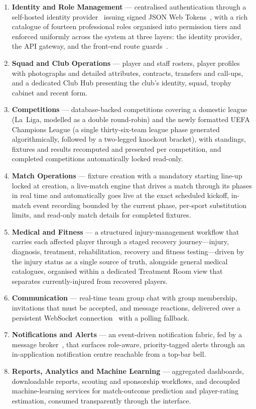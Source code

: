 \begin{enumerate}
  \item \textbf{Identity and Role Management} --- centralised authentication through a
        self-hosted identity provider~\cite{keycloak} issuing signed JSON Web
        Tokens~\cite{jwt}, with a rich catalogue of fourteen professional roles organised
        into permission tiers and enforced uniformly across the system at three layers: the
        identity provider, the API gateway, and the front-end route guards~\cite{rbac}.
  \item \textbf{Squad and Club Operations} --- player and staff rosters, player profiles
        with photographs and detailed attributes, contracts, transfers and call-ups, and a
        dedicated Club Hub presenting the club's identity, squad, trophy cabinet and recent
        form.
  \item \textbf{Competitions} --- database-backed competitions covering a domestic league
        (La~Liga, modelled as a double round-robin) and the newly formatted UEFA
        Champions League (a single thirty-six-team league phase generated algorithmically,
        followed by a two-legged knockout bracket), with standings, fixtures and results
        recomputed and presented per competition, and completed competitions automatically
        locked read-only.
  \item \textbf{Match Operations} --- fixture creation with a mandatory starting line-up
        locked at creation, a live-match engine that drives a match through its phases in
        real time and automatically goes live at the exact scheduled kickoff, in-match event
        recording bounded by the current phase, per-sport substitution limits, and read-only
        match details for completed fixtures.
  \item \textbf{Medical and Fitness} --- a structured injury-management workflow that
        carries each affected player through a staged recovery journey---injury, diagnosis,
        treatment, rehabilitation, recovery and fitness testing---driven by the injury status
        as a single source of truth, alongside general medical catalogues, organised within a
        dedicated Treatment Room view that separates currently-injured from recovered
        players.
  \item \textbf{Communication} --- real-time team group chat with group membership,
        invitations that must be accepted, and message reactions, delivered over a persistent
        WebSocket connection~\cite{websocket} with a polling fallback.
  \item \textbf{Notifications and Alerts} --- an event-driven notification fabric, fed by a
        message broker~\cite{kafka}, that surfaces role-aware, priority-tagged alerts through
        an in-application notification centre reachable from a top-bar bell.
  \item \textbf{Reports, Analytics and Machine Learning} --- aggregated dashboards,
        downloadable reports, scouting and sponsorship workflows, and decoupled
        machine-learning services for match-outcome prediction and player-rating estimation,
        consumed transparently through the interface.
\end{enumerate}

